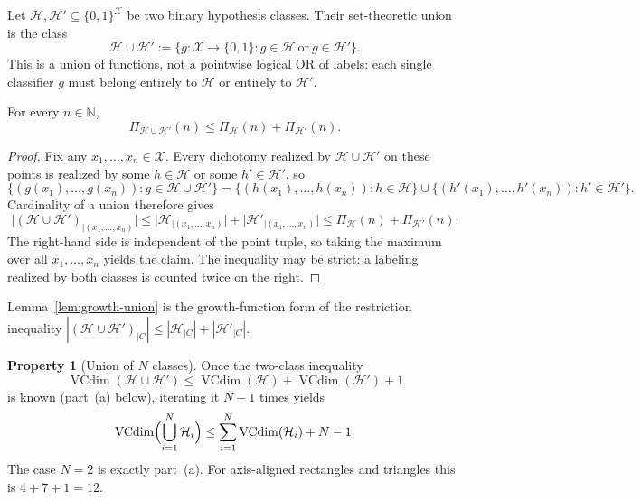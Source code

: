 \documentclass[11pt,a4paper]{article}
\DeclareMathOperator{\VCdim}{VCdim}
\theoremstyle{definition}
\newtheorem{property}[definition]{Property}
\begin{document}
\begin{definition}
Let \(\mathcal{H},\mathcal{H}'\subseteq\{0,1\}^{\mathcal{X}}\) be two binary hypothesis classes. Their set-theoretic union is the class
\[
\mathcal{H}\cup\mathcal{H}'
:=
\bigl\{g:\mathcal{X}\to\{0,1\}:g\in\mathcal{H}\ \text{or}\ g\in\mathcal{H}'\bigr\}.
\]
This is a union of functions, not a pointwise logical OR of labels: each single classifier \(g\) must belong entirely to \(\mathcal{H}\) or entirely to \(\mathcal{H}'\).
\end{definition}

\begin{lemma}
\label{lem:growth-union}
For every \(n\in\mathbb{N}\),
\[
\Pi_{\mathcal{H} \cup \mathcal{H}'}(n) \leq \Pi_{\mathcal{H}}(n) + \Pi_{\mathcal{H}'}(n).
\]
\end{lemma}

\begin{proof}
Fix any \(x_1,\dots,x_n\in\mathcal{X}\). Every dichotomy realized by \(\mathcal{H}\cup\mathcal{H}'\) on these points is realized by some \(h\in\mathcal{H}\) or some \(h'\in\mathcal{H}'\), so
\[
\bigl\{(g(x_1),\dots,g(x_n)):g\in\mathcal{H}\cup\mathcal{H}'\bigr\}
=
\bigl\{(h(x_1),\dots,h(x_n)):h\in\mathcal{H}\bigr\}
\cup
\bigl\{(h'(x_1),\dots,h'(x_n)):h'\in\mathcal{H}'\bigr\}.
\]
Cardinality of a union therefore gives
\[
\bigl|(\mathcal{H}\cup\mathcal{H}')_{|(x_1,\dots,x_n)}\bigr|
\le
\bigl|\mathcal{H}_{|(x_1,\dots,x_n)}\bigr|
+
\bigl|\mathcal{H}'_{|(x_1,\dots,x_n)}\bigr|
\le
\Pi_{\mathcal{H}}(n)+\Pi_{\mathcal{H}'}(n).
\]
The right-hand side is independent of the point tuple, so taking the maximum over all \(x_1,\dots,x_n\) yields the claim. The inequality may be strict: a labeling realized by both classes is counted twice on the right.
\end{proof}

Lemma~\ref{lem:growth-union} is the growth-function form of the restriction inequality \(|(\mathcal{H}\cup\mathcal{H}')_{|C}|\le|\mathcal{H}_{|C}|+|\mathcal{H}'_{|C}|\).

\begin{property}[Union of $N$ classes]
\label{prop:vc-union-n}
Once the two-class inequality
\[
\VCdim(\mathcal{H}\cup\mathcal{H}')
\le
\VCdim(\mathcal{H})+\VCdim(\mathcal{H}')+1
\]
is known (part~(a) below), iterating it $N-1$ times yields
\[
\VCdim\Bigl(\bigcup_{i=1}^{N}\mathcal{H}_i\Bigr)
\le
\sum_{i=1}^{N}\VCdim(\mathcal{H}_i)+N-1.
\]
The case $N=2$ is exactly part~(a). For axis-aligned rectangles and triangles this is $4+7+1=12$.
\end{property}
\end{document}
